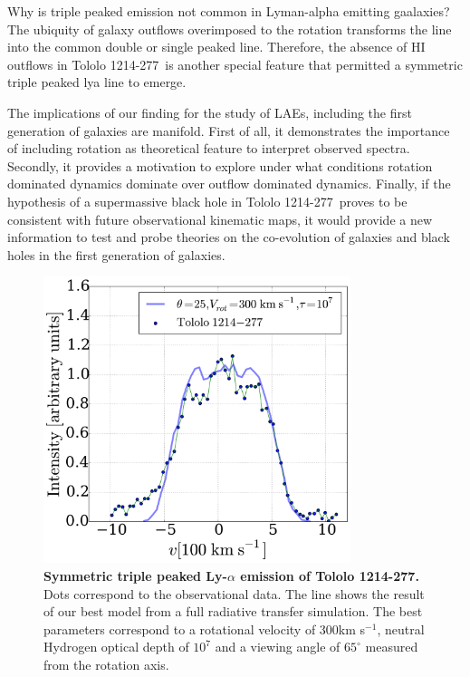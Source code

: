 \documentclass[a4paper, usenatbib, 12pt]{article}
\newcommand{\tol}{Tololo 1214-277}
\begin{document}
{Why is triple peaked emission not common in Lyman-alpha emitting
gaalaxies?   
The ubiquity of galaxy outflows overimposed to the rotation
transforms the line into the common double or single peaked
line.
Therefore, the absence of HI outflows in \tol\ is another special
feature that permitted a symmetric triple peaked lya line to emerge. 

The implications of our finding for the study of LAEs, including the
first generation of galaxies are manifold. 
First of all, it demonstrates the importance of including rotation as
theoretical feature to interpret observed spectra. 
Secondly, it provides a motivation to explore under what conditions
rotation dominated dynamics dominate over outflow
dominated dynamics. 
Finally, if the hypothesis of a supermassive black
hole in \tol\ proves to be consistent with future observational
kinematic maps, it would provide a new information to test and probe
theories on the co-evolution of galaxies and black holes in the first
generation of galaxies. 


\begin{figure}
\begin{center}
\includegraphics[width=0.8\textwidth]{tolfit.pdf}
\caption{{\bf Symmetric triple peaked Ly-$\alpha$ emission of \tol.}
  Dots correspond to the observational data. The line shows the result
of our best model from a full radiative transfer simulation. The best
parameters correspond to a rotational velocity of $300$km s$^{-1}$,
neutral Hydrogen optical depth of $10^{7}$ and a viewing angle of
$65^{\circ}$ measured from the rotation axis.} 
\end{center}
\end{figure}

}
\end{document}
